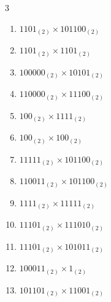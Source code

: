 \begin{multicols}{3}
\begin{enumerate}

  \item $1101_{(2)} \times 101100_{(2)}$


  \item $1101_{(2)} \times 1101_{(2)}$


  \item $100000_{(2)} \times 10101_{(2)}$


\columnbreak %

  \item $110000_{(2)} \times 11100_{(2)}$


  \item $100_{(2)} \times 1111_{(2)}$


  \item $100_{(2)} \times 100_{(2)}$


  \item $11111_{(2)} \times 101100_{(2)}$


  \item $110011_{(2)} \times 101100_{(2)}$


\columnbreak %

  \item $1111_{(2)} \times 11111_{(2)}$


  \item $11101_{(2)} \times 111010_{(2)}$


  \item $11101_{(2)} \times 101011_{(2)}$


  \item $100011_{(2)} \times 1_{(2)}$


  \item $101101_{(2)} \times 11001_{(2)}$


\end{enumerate}
\end{multicols}
